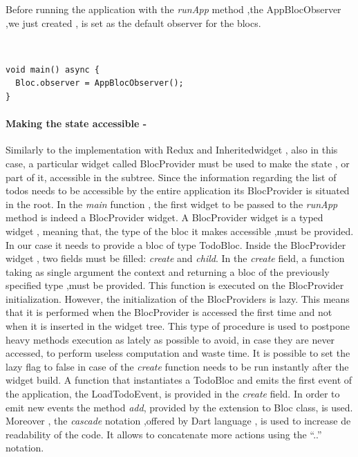 Before running the application with the \textit{runApp} method ,the AppBlocObserver ,we just created , is set as the default observer for the blocs.
\begin{code}
\mbox{}\\
 \mbox{}
\label{code:2.14}
\begin{verbatim}
void main() async {
  Bloc.observer = AppBlocObserver();
}
\end{verbatim}
\mbox{}
\end{code}
\paragraph{Making the state accessible - }
\label{subpar:todo_app_bloc_core_state}

Similarly to the implementation with Redux and Inheritedwidget , also in this case, a particular widget called BlocProvider must be used to make the state , or part of it, accessible in the subtree. Since the information regarding the list of todos needs to be accessible by the entire application its BlocProvider is situated in the root. In the \textit{main} function , the first widget to be passed to the \textit{runApp} method is indeed a BlocProvider widget. A BlocProvider widget is a typed widget , meaning that, the type of the bloc it makes accessible ,must be provided. In our case it needs to provide a bloc of type TodoBloc. Inside the BlocProvider widget , two fields must  be filled: \textit{create} and \textit{child}. In the \textit{create} field, a function taking as single argument the context and returning a bloc of the previously specified type ,must be provided. This function is executed on the BlocProvider initialization. However, the initialization of the BlocProviders is lazy. This means that it is performed when the BlocProvider is accessed the first time and not when it is inserted in the widget tree. This type of procedure is used to postpone heavy methods execution as lately as possible to avoid, in case they are never accessed, to perform useless computation and waste time. It is possible to set the lazy flag to false in case of the \textit{create} function needs to be run instantly after the widget build. A function that instantiates a TodoBloc and emits the first event of the application, the LoadTodoEvent, is provided in the \textit{create} field. In order to emit new events the method \textit{add}, provided by the extension to Bloc class, is used. Moreover , the \textit{cascade} notation ,offered by Dart language , is used to increase de readability of the code. It allows to concatenate more actions using the  “..” notation.
